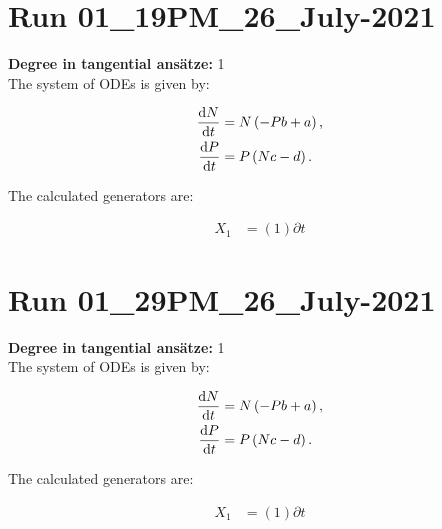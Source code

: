 \section*{Run 01\_19PM\_26\_July-2021}
\textbf{Degree in tangential ansätze:}	1\\
The system of ODEs is given by:

\begin{align*}
\dv{N}{t}&=N \left(- P b + a\right),\\
\dv{P}{t}&=P \left(N c - d\right).\\
\end{align*}

\noindent The calculated generators are:

\begin{align*}
X_{1}&=\left( 1 \right)\partial t\end{align*}
\section*{Run 01\_29PM\_26\_July-2021}
\textbf{Degree in tangential ansätze:}	1\\
The system of ODEs is given by:

\begin{align*}
\dv{N}{t}&=N \left(- P b + a\right),\\
\dv{P}{t}&=P \left(N c - d\right).\\
\end{align*}

\noindent The calculated generators are:

\begin{align*}
X_{1}&=\left( 1 \right)\partial t\end{align*}
